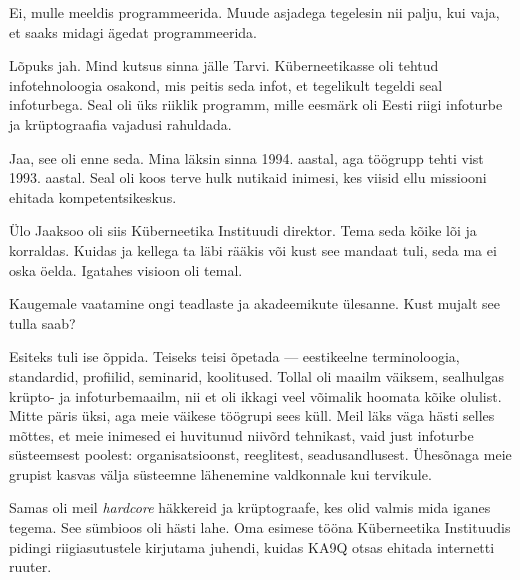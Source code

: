 Ei, mulle meeldis programmeerida. Muude asjadega tegelesin nii palju, 
kui vaja, et saaks midagi ägedat 
programmeerida. 



Lõpuks jah. Mind kutsus sinna jälle Tarvi. 
Küberneetikasse oli tehtud infotehnoloogia osakond, mis peitis seda infot, et 
tegelikult tegeldi seal infoturbega. Seal oli üks riiklik programm, 
mille eesmärk oli Eesti riigi infoturbe ja krüptograafia vajadusi rahuldada. 


Jaa, see oli enne seda. Mina läksin sinna 1994. aastal, aga töögrupp tehti vist 1993. aastal. Seal oli koos terve hulk nutikaid inimesi, kes 
viisid ellu missiooni ehitada kompetentsikeskus.

Ülo Jaaksoo oli siis Küberneetika 
Instituudi direktor. Tema seda kõike lõi ja korraldas. Kuidas ja kellega ta läbi rääkis või kust 
see mandaat tuli, seda ma ei oska öelda. Igatahes visioon oli temal. 


Kaugemale vaatamine ongi teadlaste ja akadeemikute ülesanne. Kust mujalt 
see tulla saab? 


Esiteks tuli ise õppida. Teiseks teisi õpetada --- eestikeelne terminoloogia, 
standardid, profiilid, seminarid, koolitused. Tollal oli maailm 
väiksem, sealhulgas krüpto- ja infoturbemaailm, nii et oli
ikkagi veel võimalik hoomata kõike olulist. Mitte päris üksi,
aga meie väikese töögrupi sees küll. Meil läks väga 
hästi selles mõttes, et meie inimesed ei huvitunud niivõrd tehnikast, vaid just  
infoturbe süsteemsest poolest: organisatsioonst, reeglitest, 
seadusandlusest. Ühesõnaga meie grupist kasvas välja süsteemne lähenemine valdkonnale kui 
tervikule. 

Samas oli meil \emph{hardcore} häkkereid ja krüptograafe, kes olid valmis mida iganes tegema. See 
sümbioos oli hästi lahe. Oma esimese tööna 
Küberneetika Instituudis pidingi riigiasutustele kirjutama 
juhendi, kuidas KA9Q otsas ehitada internetti ruuter. 

